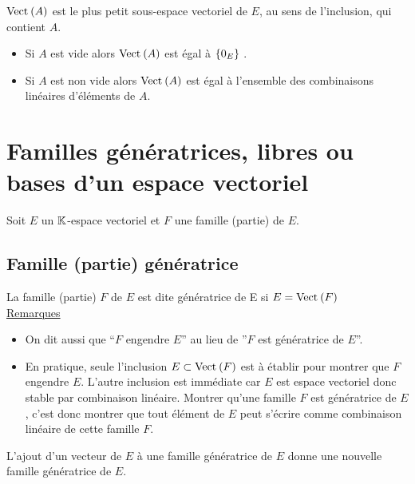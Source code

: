 \begin{defprop}[Caractérisation]
    \(\Vect{A}\) est le plus petit sous-espace vectoriel de \(E\), au sens de l’inclusion, qui contient \(A\).
\end{defprop}

\begin{theo}
    \begin{itemize}
        \item Si \(A\) est vide alors \(\Vect{A}\) est égal à \(\left\lbrace0_E \right\rbrace\) .
        \item Si \(A\) est non vide alors \(\Vect{A}\) est égal à l’ensemble des combinaisons linéaires d’éléments de \(A\).
    \end{itemize}
\end{theo}

\section{Familles génératrices, libres ou bases d’un espace vectoriel}
    Soit \(E\) un \(\mathbb{K}\)-espace vectoriel et \(F\) une famille (partie) de \(E\).
\subsection{Famille (partie) génératrice}
\begin{defi}
    La famille (partie) \(F\) de \(E\) est dite génératrice de E si \(E = \Vect{F}\)\\
    \underline{Remarques}\\
    \begin{itemize}
        \item On dit aussi que “\(F\) engendre \(E\)” au lieu de ”\(F\) est génératrice de \(E\)”.
        \item En pratique, seule l’inclusion \(E \subset \Vect{F}\) est à établir pour montrer que \(F\) engendre \(E\). L’autre inclusion est immédiate car \(E\) est espace vectoriel donc stable par combinaison linéaire. Montrer qu’une famille \(F\) est génératrice de \(E\), c’est donc montrer que tout élément de \(E\) peut s’écrire comme combinaison linéaire de cette famille \(F\).
    \end{itemize}
\end{defi}

\begin{prop}
    L’ajout d’un vecteur de \(E\) à une famille génératrice de \(E\) donne une nouvelle famille génératrice de \(E\).
\end{prop}
